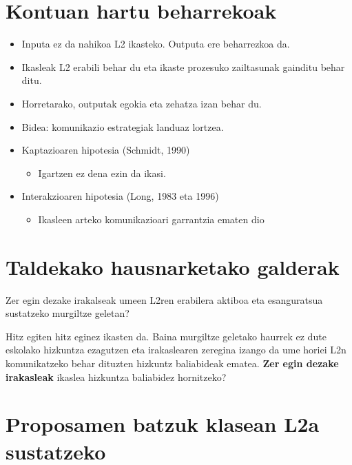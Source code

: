 \documentclass[
]{book}
\providecommand{\tightlist}{%
  \setlength{\itemsep}{0pt}\setlength{\parskip}{0pt}}
\begin{document}
\hypertarget{kontuan-hartu-beharrekoak}{%
\section{Kontuan hartu beharrekoak}\label{kontuan-hartu-beharrekoak}}

\begin{itemize}
\tightlist
\item
  Inputa ez da nahikoa L2 ikasteko. Outputa ere beharrezkoa da.
\item
  Ikasleak L2 erabili behar du eta ikaste prozesuko zailtasunak gainditu behar ditu.
\item
  Horretarako, outputak egokia eta zehatza izan behar du.
\item
  Bidea: komunikazio estrategiak landuaz lortzea.
\item
  Kaptazioaren hipotesia (Schmidt, 1990)

  \begin{itemize}
  \tightlist
  \item
    Igartzen ez dena ezin da ikasi.
  \end{itemize}
\item
  Interakzioaren hipotesia (Long, 1983 eta 1996)

  \begin{itemize}
  \tightlist
  \item
    Ikasleen arteko komunikazioari garrantzia ematen dio
  \end{itemize}
\end{itemize}

\hypertarget{taldekako-hausnarketako-galderak}{%
\section{Taldekako hausnarketako galderak}\label{taldekako-hausnarketako-galderak}}

Zer egin dezake irakalseak umeen L2ren erabilera aktiboa eta esanguratsua sustatzeko murgiltze geletan?

Hitz egiten hitz eginez ikasten da. Baina murgiltze geletako haurrek ez dute eskolako hizkuntza ezagutzen eta irakaslearen zeregina izango da ume horiei L2n komunikatzeko behar dituzten hizkuntz baliabideak ematea. \textbf{Zer egin dezake irakasleak} ikaslea hizkuntza baliabidez hornitzeko?

\hypertarget{proposamen-batzuk-klasean-l2a-sustatzeko}{%
\section{Proposamen batzuk klasean L2a sustatzeko}\label{proposamen-batzuk-klasean-l2a-sustatzeko}}
\end{document}
